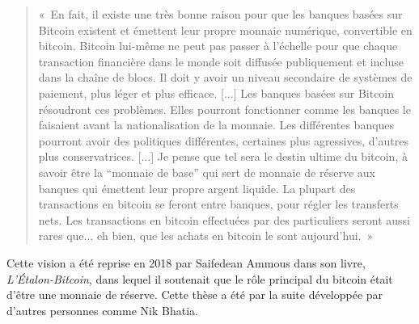 \begin{quote}
«~En fait, il existe une très bonne raison pour que les banques basées sur Bitcoin existent et émettent leur propre monnaie numérique, convertible en bitcoin. Bitcoin lui-même ne peut pas passer à l'échelle pour que chaque transaction financière dans le monde soit diffusée publiquement et incluse dans la chaîne de blocs. Il doit y avoir un niveau secondaire de systèmes de paiement, plus léger et plus efficace. [...] Les banques basées sur Bitcoin résoudront ces problèmes. Elles pourront fonctionner comme les banques le faisaient avant la nationalisation de la monnaie. Les différentes banques pourront avoir des politiques différentes, certaines plus agressives, d'autres plus conservatrices. [...] Je pense que tel sera le destin ultime du bitcoin, à savoir être la “monnaie de base” qui sert de monnaie de réserve aux banques qui émettent leur propre argent liquide. La plupart des transactions en bitcoin se feront entre banques, pour régler les transferts nets. Les transactions en bitcoin effectuées par des particuliers seront aussi rares que... eh bien, que les achats en bitcoin le sont aujourd'hui.~»
\end{quote}

Cette vision a été reprise en 2018 par Saifedean Ammous dans son livre, \emph{L'Étalon-Bitcoin}, dans lequel il soutenait que le rôle principal du bitcoin était d'être une monnaie de réserve. Cette thèse a été par la suite développée par d'autres personnes comme Nik Bhatia. %

